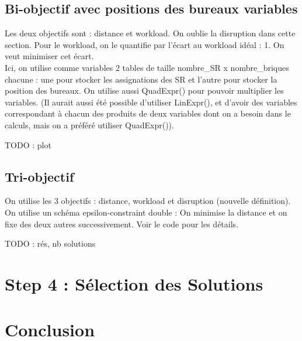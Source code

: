 \documentclass[12pt,a4paper]{article}
\begin{document}
\subsection*{Bi-objectif avec positions des bureaux variables}
Les deux objectifs sont : distance et workload. On oublie la disruption dans cette section. Pour le workload, on le quantifie par l'écart au workload idéal : 1. On veut minimiser cet écart.\\
Ici, on utilise comme variables 2 tables de taille nombre\_SR x nombre\_briques chacune : une pour stocker les assignations des SR et l'autre pour stocker la position des bureaux. On utilise aussi QuadExpr() pour pouvoir multiplier les variables. (Il aurait aussi été possible d'utiliser LinExpr(), et d'avoir des variables correspondant à chacun des produits de deux variables dont on a besoin dans le calculs, mais on a préféré utiliser QuadExpr()).

TODO : plot

\subsection*{Tri-objectif}
On utilise les 3 objectifs : distance, workload et disruption (nouvelle définition). On utilise un schéma epsilon-constraint double : On minimise la distance et on fixe des deux autres successivement. Voir le code pour les détails.

TODO : rés, nb solutions

\section*{Step 4 : Sélection des Solutions}


\section*{Conclusion}
\end{document}

